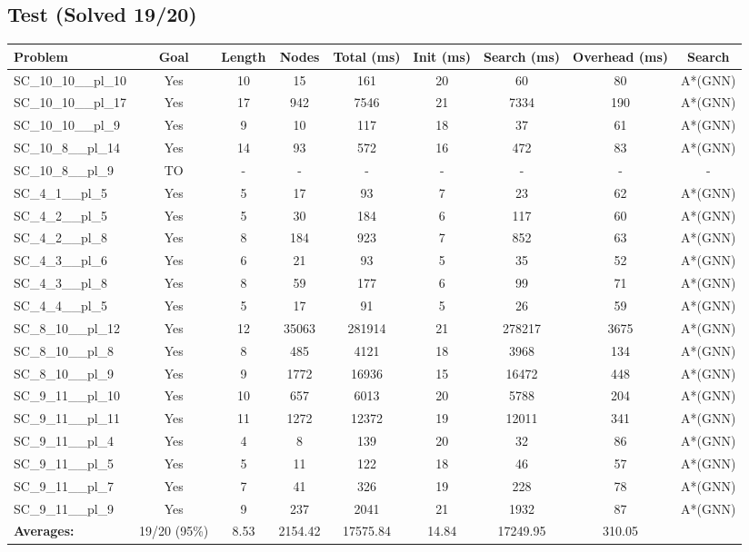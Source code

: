 \documentclass{article}
\begin{document}
\subsection*{Test (Solved 19/20)}
\begin{tabular}{lcccccccc}
\toprule
Problem & Goal & Length & Nodes & Total (ms) & Init (ms) & Search (ms) & Overhead (ms) & Search \\
\midrule
SC\_10\_10\_\_pl\_10 & Yes & 10 & 15 & 161 & 20 & 60 & 80 & A*(GNN) \\
SC\_10\_10\_\_pl\_17 & Yes & 17 & 942 & 7546 & 21 & 7334 & 190 & A*(GNN) \\
SC\_10\_10\_\_pl\_9 & Yes & 9 & 10 & 117 & 18 & 37 & 61 & A*(GNN) \\
SC\_10\_8\_\_pl\_14 & Yes & 14 & 93 & 572 & 16 & 472 & 83 & A*(GNN) \\
SC\_10\_8\_\_pl\_9 & TO & - & - & - & - & - & - & - \\
SC\_4\_1\_\_pl\_5 & Yes & 5 & 17 & 93 & 7 & 23 & 62 & A*(GNN) \\
SC\_4\_2\_\_pl\_5 & Yes & 5 & 30 & 184 & 6 & 117 & 60 & A*(GNN) \\
SC\_4\_2\_\_pl\_8 & Yes & 8 & 184 & 923 & 7 & 852 & 63 & A*(GNN) \\
SC\_4\_3\_\_pl\_6 & Yes & 6 & 21 & 93 & 5 & 35 & 52 & A*(GNN) \\
SC\_4\_3\_\_pl\_8 & Yes & 8 & 59 & 177 & 6 & 99 & 71 & A*(GNN) \\
SC\_4\_4\_\_pl\_5 & Yes & 5 & 17 & 91 & 5 & 26 & 59 & A*(GNN) \\
SC\_8\_10\_\_pl\_12 & Yes & 12 & 35063 & 281914 & 21 & 278217 & 3675 & A*(GNN) \\
SC\_8\_10\_\_pl\_8 & Yes & 8 & 485 & 4121 & 18 & 3968 & 134 & A*(GNN) \\
SC\_8\_10\_\_pl\_9 & Yes & 9 & 1772 & 16936 & 15 & 16472 & 448 & A*(GNN) \\
SC\_9\_11\_\_pl\_10 & Yes & 10 & 657 & 6013 & 20 & 5788 & 204 & A*(GNN) \\
SC\_9\_11\_\_pl\_11 & Yes & 11 & 1272 & 12372 & 19 & 12011 & 341 & A*(GNN) \\
SC\_9\_11\_\_pl\_4 & Yes & 4 & 8 & 139 & 20 & 32 & 86 & A*(GNN) \\
SC\_9\_11\_\_pl\_5 & Yes & 5 & 11 & 122 & 18 & 46 & 57 & A*(GNN) \\
SC\_9\_11\_\_pl\_7 & Yes & 7 & 41 & 326 & 19 & 228 & 78 & A*(GNN) \\
SC\_9\_11\_\_pl\_9 & Yes & 9 & 237 & 2041 & 21 & 1932 & 87 & A*(GNN) \\
\textbf{Averages:} & 19/20 (95\%) & 8.53 & 2154.42 & 17575.84 & 14.84 & 17249.95 & 310.05 & \\
\bottomrule
\end{tabular}
\\[0.7cm]
\end{document}
